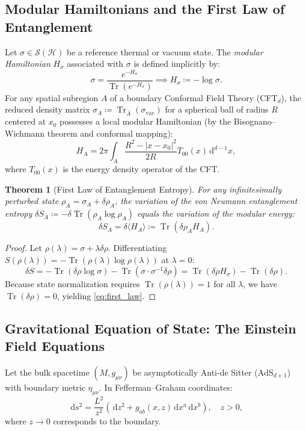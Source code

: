 \documentclass[11pt,a4paper,reqno]{amsart}
\newtheorem{theorem}{Theorem}[section]
\theoremstyle{definition}
\numberwithin{equation}{section}
\newcommand{\Tr}{\operatorname{Tr}}
\newcommand{\dif}{\,\mathrm{d}}
\begin{document}
\subsection{Modular Hamiltonians and the First Law of Entanglement}
Let $\sigma \in \mathcal{S}(\mathscr{H})$ be a reference thermal or vacuum state. The \emph{modular Hamiltonian} $H_\sigma$ associated with $\sigma$ is defined implicitly by:
\begin{equation}
    \label{eq:modular_hamiltonian}
    \sigma = \frac{e^{-H_\sigma}}{\Tr(e^{-H_\sigma})} \implies H_\sigma \coloneqq -\log \sigma.
\end{equation}
For any spatial subregion $A$ of a boundary Conformal Field Theory (CFT$_d$), the reduced density matrix $\sigma_A \coloneqq \Tr_{\bar{A}}(\sigma_{\mathrm{vac}})$ for a spherical ball of radius $R$ centered at $x_0$ possesses a local modular Hamiltonian (by the Bisognano--Wichmann theorem and conformal mapping):
\begin{equation}
    \label{eq:local_modular_ham}
    H_A = 2\pi \int_A \frac{R^2 - |x - x_0|^2}{2 R} T_{00}(x) \dif^{d-1} x,
\end{equation}
where $T_{00}(x)$ is the energy density operator of the CFT.

\begin{theorem}[First Law of Entanglement Entropy]
\label{thm:first_law_entanglement}
For any infinitesimally perturbed state $\rho_A = \sigma_A + \delta \rho_A$, the variation of the von Neumann entanglement entropy $\delta S_A \coloneqq -\delta \Tr(\rho_A \log \rho_A)$ equals the variation of the modular energy:
\begin{equation}
    \label{eq:first_law}
    \delta S_A = \delta \langle H_A \rangle \coloneqq \Tr(\delta \rho_A H_A).
\end{equation}
\end{theorem}
\begin{proof}
Let $\rho(\lambda) = \sigma + \lambda \delta \rho$. Differentiating $S(\rho(\lambda)) = -\Tr(\rho(\lambda) \log \rho(\lambda))$ at $\lambda = 0$:
\begin{equation}
    \delta S = -\Tr(\delta \rho \log \sigma) - \Tr(\sigma \cdot \sigma^{-1} \delta \rho) = \Tr(\delta \rho H_\sigma) - \Tr(\delta \rho).
\end{equation}
Because state normalization requires $\Tr(\rho(\lambda)) = 1$ for all $\lambda$, we have $\Tr(\delta \rho) = 0$, yielding \eqref{eq:first_law}.
\end{proof}

\subsection{Gravitational Equation of State: The Einstein Field Equations}
Let the bulk spacetime $(M, g_{\mu\nu})$ be asymptotically Anti-de Sitter ($\mathrm{AdS}_{d+1}$) with boundary metric $\eta_{\mu\nu}$. In Fefferman--Graham coordinates:
\begin{equation}
    \dif s^2 = \frac{L^2}{z^2}\left( \dif z^2 + g_{ab}(x, z) \dif x^a \dif x^b \right), \quad z > 0,
\end{equation}
where $z \to 0$ corresponds to the boundary.
\end{document}
